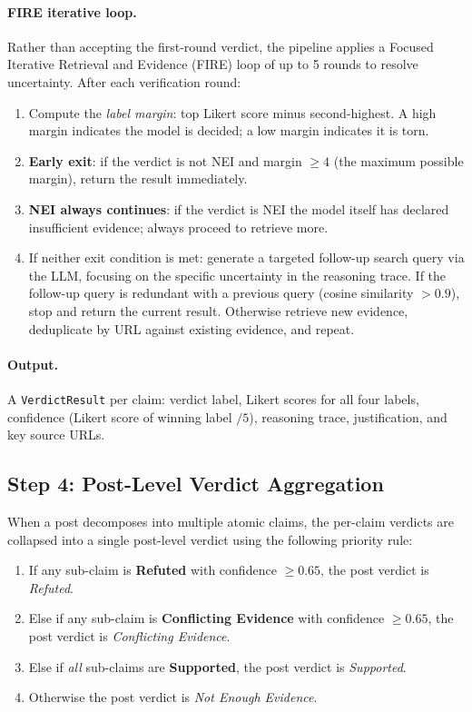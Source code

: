\paragraph{FIRE iterative loop.}
Rather than accepting the first-round verdict, the pipeline applies a Focused Iterative Retrieval and Evidence (FIRE) loop of up to 5 rounds to resolve uncertainty. After each verification round:
\begin{enumerate}
  \item Compute the \emph{label margin}: top Likert score minus second-highest. A high margin indicates the model is decided; a low margin indicates it is torn.
  \item \textbf{Early exit}: if the verdict is not NEI and margin $\geq 4$ (the maximum possible margin), return the result immediately.
  \item \textbf{NEI always continues}: if the verdict is NEI the model itself has declared insufficient evidence; always proceed to retrieve more.
  \item If neither exit condition is met: generate a targeted follow-up search query via the LLM, focusing on the specific uncertainty in the reasoning trace. If the follow-up query is redundant with a previous query (cosine similarity $> 0.9$), stop and return the current result. Otherwise retrieve new evidence, deduplicate by URL against existing evidence, and repeat.
\end{enumerate}

\paragraph{Output.}
A \texttt{VerdictResult} per claim: verdict label, Likert scores for all four labels, confidence (Likert score of winning label $/ 5$), reasoning trace, justification, and key source URLs.

\subsection{Step 4: Post-Level Verdict Aggregation}

When a post decomposes into multiple atomic claims, the per-claim verdicts are collapsed into a single post-level verdict using the following priority rule:

\begin{enumerate}
  \item If any sub-claim is \textbf{Refuted} with confidence $\geq 0.65$, the post verdict is \emph{Refuted}.
  \item Else if any sub-claim is \textbf{Conflicting Evidence} with confidence $\geq 0.65$, the post verdict is \emph{Conflicting Evidence}.
  \item Else if \emph{all} sub-claims are \textbf{Supported}, the post verdict is \emph{Supported}.
  \item Otherwise the post verdict is \emph{Not Enough Evidence}.
\end{enumerate}

